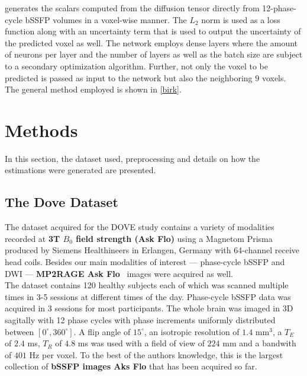 \autocite{birk_high-resolution_2022} generates the scalars computed from the diffusion tensor directly from 12-phase-cycle bSSFP volumes in a voxel-wise manner.
The $L_2$ norm is used as a loss function along with an uncertainty term that is used to output the uncertainty of the predicted voxel as well.
The network employs dense layers where the amount of neurons per layer and the number of layers as well as the batch size are subject to a secondary optimization algorithm.
Further, not only the voxel to be predicted is passed as input to the network but also the neighboring $9$ voxels.
The general method employed is shown in \ref{birk}.




\newpage

\chapter{Methods}\label{\positionnumber} 
In this section, the dataset used, preprocessing and details on how the estimations were generated are presented.
\section{The Dove Dataset}
The dataset acquired for the DOVE study contains a variety of modalities recorded at \textbf{3T $B_0$ field strength (Ask Flo)} using a Magnetom Prisma produced by Siemens Healthineers in Erlangen, Germany with 64-channel receive head coils.
Besides our main modalities of interest --- phase-cycle bSSFP and DWI --- \textbf{MP2RAGE Ask Flo}~\autocite{marques_mp2rage_2010} images were acquired as well. \\

The dataset contains 120 healthy subjects each of which was scanned multiple times in 3-5 sessions at different times of the day.
Phase-cycle bSSFP data was acquired in 3 sessions for most participants.
The whole brain was imaged in 3D sagitally with 12 phase cycles with phase increments uniformly distributed between $[0^\circ, 360^\circ]$.
A flip angle of $15^\circ$, an isotropic resolution of $1.4$ mm$^3$, a $T_E$ of $2.4$ ms, $T_R$ of $4.8$ ms was used with a field of view of $224$ mm and a bandwith of $401$ Hz per voxel.
To the best of the authors knowledge, this is the largest collection of \textbf{bSSFP images Aks Flo} that has been acquired so far. \\

